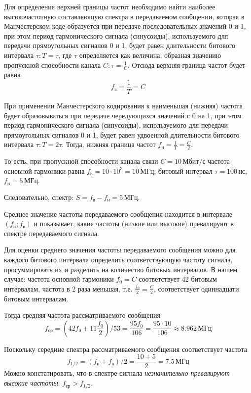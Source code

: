 Для определения верхней границы частот необходимо найти наиболее высокочастотную составляющую спектра в передаваемом сообщении, которая в Манчестерском коде образуется при передаче последовательных значений 0 и 1, при этом период гармонического сигнала (синусоиды), используемого для передачи прямоугольных сигналов 0 и 1, будет равен длительности битового интервала $\tau: T = \tau$, где $\tau$ определяется как величина, образная значению пропускной способности канала $C: \tau = \frac{1}{C}$. Отсюда верхняя граница частот будет равна \[f_{\text{в}} = \frac{1}{T} = C\]

При применении Манчестерского кодирования к наименьшая (нижняя) частота будет образовываться при передаче чередующихся значений с 0 на 1, при этом период гармонического сигнала (синусоиды), используемого для передачи прямоугольных сигналов 0 и 1, будет равен удвоенной длительности битового интервала $\tau: T = 2\tau$. Тогда, нижняя граница частот $f_{\text{н}} = \frac{1}{T} = \frac{C}{2}$.

То есть, при пропускной способности канала связи $C = 10 \, \text{Мбит/с}$ частота основной гармоники равна $f_{\text{в}} = 10 \cdot 10^3 = 10 \, \text{МГц}$, битовый интервал $\tau = 100 \, \text{нс}$, $f_{\text{н}} = 5 \, \text{МГц}$.

Следовательно, спектр: $S = f_{\text{в}} - f_{\text{н}} = 5 \, \text{МГц}$.

Среднее значение частоты передаваемого сообщения находится в интервале $(f_{\text{н}};f_{\text{в}})$ и показывает, какие частоты (низкие или высокие) превалируют в спектре передаваемого сигнала.

Для оценки среднего значения частоты передаваемого сообщения можно для каждого битового интервала определить соответствующую частоту сигнала, просуммировать их и разделить на количество битовых интервалов. В нашем случае: частота основной гармоники $f_0 = C$ соответствует 42 битовым интервалам, частота в 2 раза меньшая, т.е. $\frac{f_0}{2} = \frac{C}{2}$, соответствует одиннадцати битовым интервалам.

Тогда средняя частота рассматриваемого сообщения
\[
	f_{\text{ср}} = \left(42f_0+11\frac{f_0}{2}\right)/ 53 = \frac{95f_0}{106} = \frac{95 \cdot 10}{106} \approx 8.962 \, \text{МГц}
\]

Поскольку середине спектра рассматриваемого сообщения соответствует частота
\[
	f_{1/2} = (f_{\text{н}} + f_{\text{в}}) /2 = \frac{10 + 5}{2} = 7.5 \, \text{МГц}
\]
Можно констатировать, что в спектре сигнала \textit{незначительно превалируют высокие частоты}: $f_{\text{ср}} > f_{1/2}$.


